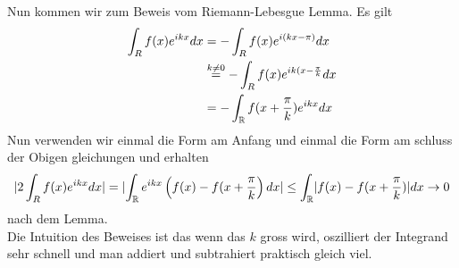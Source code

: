 Nun kommen wir zum Beweis vom Riemann-Lebesgue Lemma. Es gilt
\begin{align*}
				\int_R f(x) e^{ikx} dx &= - \int_R f(x) e^{i(kx - \pi)} dx\\
															 &\stackrel{k \neq 0}{=} - \int_R f(x) e^{ik(x - \frac{\pi}{k}}dx\\
															 &= - \int_{\mathbb{R}} f(x + \frac{\pi}{k}) e^{ikx}dx
\end{align*}
Nun verwenden wir einmal die Form am Anfang und einmal die Form am schluss der Obigen gleichungen und erhalten
\begin{align*}
	\abs{2 \int_Rf(x) e^{ikx}dx} = \abs{\int_{\R}e^{ikx}\left(f(x) - f(x + \frac{\pi}{k}\right) dx}\leq \int_{\R} \abs{f(x) - f(x + \frac{\pi}{k})} dx \to 0
\end{align*}
nach dem Lemma.\\

Die Intuition des Beweises ist das wenn das $k$ gross wird, oszilliert der Integrand sehr schnell und man addiert und subtrahiert praktisch gleich viel.

